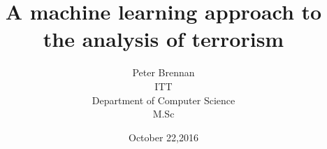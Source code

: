 \documentclass[options]{report}
\begin{document}

\title{A machine learning approach to the analysis of terrorism}
\author{Peter Brennan\\ITT\\Department of Computer Science\\M.Sc}
\date{October 22,2016}




\maketitle
{}


\tableofcontents
\listoffigures
\listoftables

%
%
%
%
%

\pagestyle{headings}







\begin{appendices}




\end{appendices}




\end{document}
